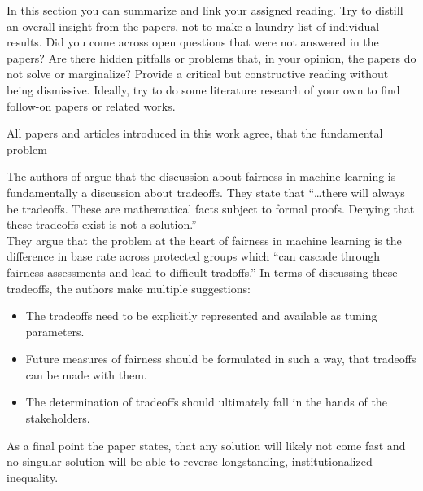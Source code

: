 In this section you can summarize and link your assigned reading. Try to distill an overall insight 
from the papers, not to make a laundry list of individual results. Did you come across open questions 
that were not answered in the papers? Are there hidden pitfalls or problems that, in your opinion, the 
papers do not solve or marginalize? Provide a critical but constructive reading without being dismissive. 
Ideally, try to do some literature research of your own to find follow-on papers or related works. 


All papers and articles introduced in this work agree, that the fundamental problem

The authors of \cite{Berk.2018} argue that the discussion about fairness in machine learning 
is fundamentally a discussion about tradeoffs. They state that \enquote{\dots there will 
always be tradeoffs. These are mathematical facts subject to formal proofs. Denying that these
tradeoffs exist is not a solution.} \\
They argue that the problem at the heart of fairness in machine learning is the difference
in base rate across protected groups which \enquote{can cascade through fairness assessments
and lead to difficult tradoffs.} In terms of discussing these tradeoffs, the authors make multiple
suggestions:
\begin{itemize}
    \item The tradeoffs need to be explicitly represented and available as tuning parameters.
    \item Future measures of fairness should be formulated in such a way, that tradeoffs can
    be made with them.
    \item The determination of tradeoffs should ultimately fall in the hands of the stakeholders.
\end{itemize}
As a final point the paper states, that any solution will likely not come fast and no singular
solution will be able to reverse longstanding, institutionalized inequality.